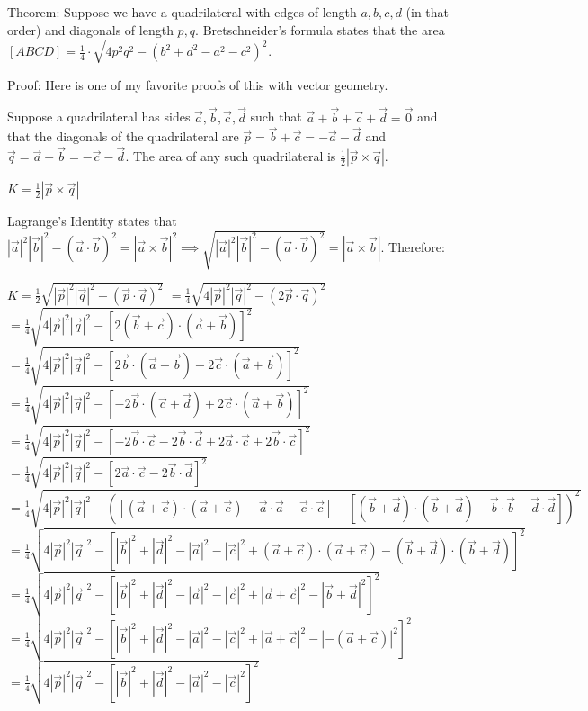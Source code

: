 \begin{enumerate}
 Theorem: Suppose we have a quadrilateral with edges of length $a,b,c,d$ (in that order) and diagonals of length $p, q$. Bretschneider's formula states that the area $[ABCD]=\frac{1}{4} \cdot \sqrt{4p^2q^2-(b^2+d^2-a^2-c^2)^2}$.

 Proof: Here is one of my favorite proofs of this with vector geometry. 

 Suppose a quadrilateral has sides $\vec{a}, \vec{b}, \vec{c}, \vec{d}$ such that $\vec{a} + \vec{b} + \vec{c} + \vec{d} = \vec{0}$ and that the diagonals of the quadrilateral are $\vec{p} = \vec{b} + \vec{c} = -\vec{a} - \vec{d}$ and $\vec{q} = \vec{a} + \vec{b} = -\vec{c} - \vec{d}$. The area of any such quadrilateral is $\frac{1}{2} |\vec{p} \times \vec{q}|$.

 
$K = \frac{1}{2} |\vec{p} \times \vec{q}|$

 Lagrange's Identity states that $|\vec{a}|^2|\vec{b}|^2-(\vec{a}\cdot\vec{b})^2=|\vec{a}\times\vec{b}|^2 \implies \sqrt{|\vec{a}|^2|\vec{b}|^2-(\vec{a}\cdot\vec{b})^2}=|\vec{a}\times\vec{b}|$. Therefore:

 $K = \frac{1}{2} \sqrt{|\vec{p}|^2|\vec{q}|^2 - (\vec{p} \cdot \vec{q})^2}$
$= \frac{1}{4} \sqrt{4 |\vec{p}|^2|\vec{q}|^2 - (2 \vec{p} \cdot \vec{q})^2}$
$= \frac{1}{4} \sqrt{4 |\vec{p}|^2|\vec{q}|^2 - [2 (\vec{b} + \vec{c}) \cdot (\vec{a} + \vec{b})]^2}$
$= \frac{1}{4} \sqrt{4 |\vec{p}|^2|\vec{q}|^2 - [2 \vec{b} \cdot (\vec{a} + \vec{b}) + 2 \vec{c} \cdot (\vec{a} + \vec{b})]^2}$
$= \frac{1}{4} \sqrt{4 |\vec{p}|^2|\vec{q}|^2 - [-2 \vec{b} \cdot (\vec{c} + \vec{d}) + 2 \vec{c} \cdot (\vec{a} + \vec{b})]^2}$
$= \frac{1}{4} \sqrt{4 |\vec{p}|^2|\vec{q}|^2 - [-2 \vec{b} \cdot \vec{c} - 2 \vec{b} \cdot \vec{d} + 2 \vec{a} \cdot \vec{c} + 2 \vec{b} \cdot \vec{c}]^2}$
$= \frac{1}{4} \sqrt{4 |\vec{p}|^2|\vec{q}|^2 - [2 \vec{a} \cdot \vec{c} - 2 \vec{b} \cdot \vec{d}]^2}$
$= \frac{1}{4} \sqrt{4 |\vec{p}|^2|\vec{q}|^2 - ([(\vec{a} + \vec{c})\cdot(\vec{a} + \vec{c}) - \vec{a}\cdot\vec{a} - \vec{c}\cdot\vec{c}] - [(\vec{b} + \vec{d})\cdot(\vec{b} + \vec{d}) - \vec{b}\cdot\vec{b} - \vec{d}\cdot\vec{d}])^2}$
$= \frac{1}{4} \sqrt{4 |\vec{p}|^2|\vec{q}|^2 - [|\vec{b}|^2 + |\vec{d}|^2 - |\vec{a}|^2 - |\vec{c}|^2 + (\vec{a} + \vec{c})\cdot(\vec{a} + \vec{c}) - (\vec{b} + \vec{d})\cdot(\vec{b} + \vec{d})]^2}$
$= \frac{1}{4} \sqrt{4 |\vec{p}|^2|\vec{q}|^2 - [|\vec{b}|^2 + |\vec{d}|^2 - |\vec{a}|^2 - |\vec{c}|^2 + |\vec{a} + \vec{c}|^2 - |\vec{b} + \vec{d}|^2]^2}$
$= \frac{1}{4} \sqrt{4 |\vec{p}|^2|\vec{q}|^2 - [|\vec{b}|^2 + |\vec{d}|^2 - |\vec{a}|^2 - |\vec{c}|^2 + |\vec{a} + \vec{c}|^2 - |-(\vec{a} + \vec{c})|^2]^2}$
$= \frac{1}{4} \sqrt{4 |\vec{p}|^2|\vec{q}|^2 - [|\vec{b}|^2 + |\vec{d}|^2 - |\vec{a}|^2 - |\vec{c}|^2]^2}$


\end{enumerate}
